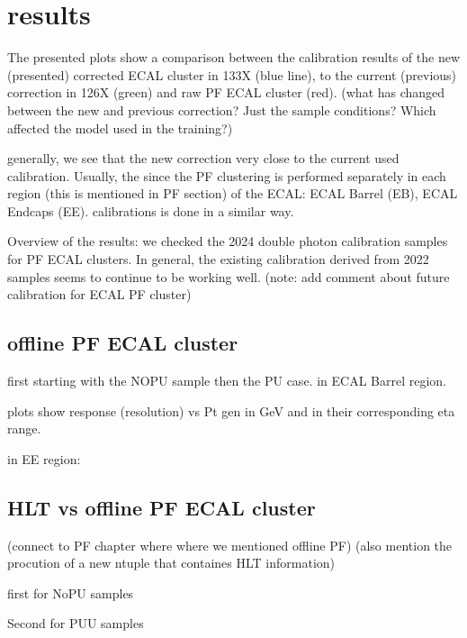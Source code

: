 \section{results}

The presented plots show a comparison between the calibration results of the new (presented) corrected ECAL cluster in 133X (blue line), to the current (previous) correction in 126X (green) and raw PF ECAL cluster (red). (what has changed between the new and previous correction? Just the sample conditions? Which affected the model used in the training?)  

generally, we see that the new correction very close to the current used calibration. Usually, the since the PF clustering is performed separately in each region (this is mentioned in PF section) of the ECAL: ECAL Barrel (EB), ECAL Endcaps (EE). calibrations is done in a similar way.

Overview of the results: we checked the 2024 double photon calibration samples for PF ECAL clusters. In general, the existing calibration derived from 2022 samples seems to continue to be working well. (note: add comment about future calibration for ECAL PF cluster)


\subsection{offline PF ECAL cluster}

first starting with the NOPU sample then the PU case. in ECAL Barrel region. 

plots show response (resolution) vs Pt gen in GeV and in their corresponding eta range.






in EE region:





\subsection{HLT vs offline PF ECAL cluster}

(connect to PF chapter where where we mentioned offline PF)
(also mention the procution of a new ntuple that containes HLT information) 

first for NoPU samples

Second for PUU samples


